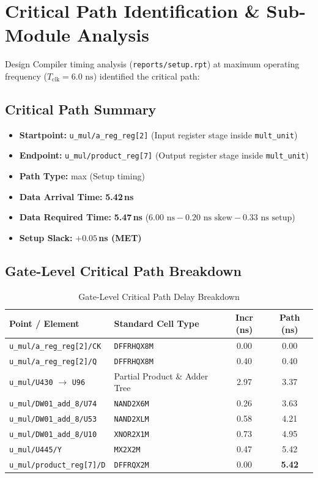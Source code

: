 \documentclass[12pt,a4paper]{article}
\begin{document}
\section{Critical Path Identification \& Sub-Module Analysis}

Design Compiler timing analysis (\texttt{reports/setup.rpt}) at maximum operating frequency ($T_{\text{clk}} = 6.0\text{ ns}$) identified the critical path:

\subsection{Critical Path Summary}
\begin{itemize}
  \item \textbf{Startpoint:} \texttt{u\_mul/a\_reg\_reg[2]} (Input register stage inside \texttt{mult\_unit})
  \item \textbf{Endpoint:} \texttt{u\_mul/product\_reg[7]} (Output register stage inside \texttt{mult\_unit})
  \item \textbf{Path Type:} max (Setup timing)
  \item \textbf{Data Arrival Time:} \textbf{5.42\,ns}
  \item \textbf{Data Required Time:} \textbf{5.47\,ns} ($6.00\text{ ns} - 0.20\text{ ns skew} - 0.33\text{ ns setup}$)
  \item \textbf{Setup Slack:} \textbf{$+0.05$\,ns (MET)}
\end{itemize}

\subsection{Gate-Level Critical Path Breakdown}

\begin{table}[H]
\centering
\small
\begin{tabular}{llcc}
\toprule
\textbf{Point / Element} & \textbf{Standard Cell Type} & \textbf{Incr (ns)} & \textbf{Path (ns)} \\
\midrule
\texttt{u\_mul/a\_reg\_reg[2]/CK} & \texttt{DFFRHQX8M} & 0.00 & 0.00 \\
\texttt{u\_mul/a\_reg\_reg[2]/Q}  & \texttt{DFFRHQX8M} & 0.40 & 0.40 \\
\texttt{u\_mul/U430} $\to$ \texttt{U96} & Partial Product \& Adder Tree & 2.97 & 3.37 \\
\texttt{u\_mul/DW01\_add\_8/U74}  & \texttt{NAND2X6M} & 0.26 & 3.63 \\
\texttt{u\_mul/DW01\_add\_8/U53}  & \texttt{NAND2XLM} & 0.58 & 4.21 \\
\texttt{u\_mul/DW01\_add\_8/U10}  & \texttt{XNOR2X1M} & 0.73 & 4.95 \\
\texttt{u\_mul/U445/Y}           & \texttt{MX2X2M} & 0.47 & 5.42 \\
\texttt{u\_mul/product\_reg[7]/D} & \texttt{DFFRQX2M} & 0.00 & \textbf{5.42} \\
\bottomrule
\end{tabular}
\caption{Gate-Level Critical Path Delay Breakdown}
\end{table}
\end{document}
